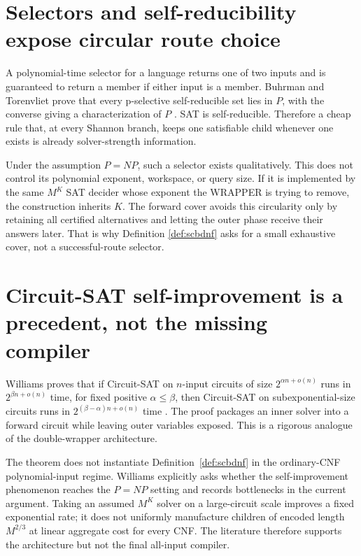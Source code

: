\documentclass[11pt]{article}
\begin{document}
\section{Selectors and self-reducibility expose circular route choice}

A polynomial-time selector for a language returns one of two inputs and is
guaranteed to return a member if either input is a member.  Buhrman and
Torenvliet prove that every p-selective self-reducible set lies in $P$, with
the converse giving a characterization of $P$
\cite{buhrmantorenvliet1996}.  SAT is self-reducible.  Therefore a cheap rule
that, at every Shannon branch, keeps one satisfiable child whenever one
exists is already solver-strength information.

Under the assumption $P=NP$, such a selector exists qualitatively.  This
does not control its polynomial exponent, workspace, or query size.  If it
is implemented by the same $M^K$ SAT decider whose exponent the WRAPPER is
trying to remove, the construction inherits $K$.  The forward cover avoids
this circularity only by retaining all certified alternatives and letting
the outer phase receive their answers later.  That is why Definition
\ref{def:scbdnf} asks for a small exhaustive cover, not a successful-route
selector.

\section{Circuit-SAT self-improvement is a precedent, not the missing compiler}

Williams proves that if Circuit-SAT on $n$-input circuits of size
$2^{\alpha n+o(n)}$ runs in $2^{\beta n+o(n)}$ time, for fixed positive
$\alpha\le\beta$, then Circuit-SAT on subexponential-size circuits runs in
$2^{(\beta-\alpha)n+o(n)}$ time \cite{williams2024}.  The proof packages an
inner solver into a forward circuit while leaving outer variables exposed.
This is a rigorous analogue of the double-wrapper architecture.

The theorem does not instantiate Definition~\ref{def:scbdnf} in the
ordinary-CNF polynomial-input regime.  Williams explicitly asks whether the
self-improvement phenomenon reaches the $P=NP$ setting and records
bottlenecks in the current argument.  Taking an assumed $M^K$ solver on a
large-circuit scale improves a fixed exponential rate; it does not uniformly
manufacture children of encoded length $M^{2/3}$ at linear aggregate cost
for every CNF.  The literature therefore supports the architecture but not
the final all-input compiler.
\end{document}
